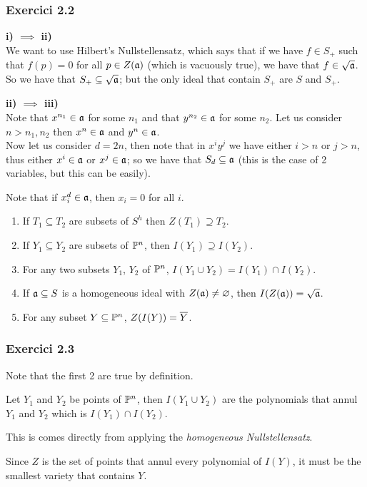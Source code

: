 \documentclass[11pt, a4paper]{article}
\begin{document}
\subsubsection{Exercici 2.2}
\textbf{i) $\implies$ ii)}\\
We want to use Hilbert's Nullstellensatz, which says that if we have $f\in S_+$ such that $f(p)=0$ for all $p\in Z(\mathfrak a)$ (which is vacuously true), we have that $f\in \sqrt{\mathfrak a}$. So we have that $S_+\subseteq \sqrt{\mathfrak a}$; but the only ideal that contain $S_+$ are $S$ and $S_+$.\par
\textbf{ii) $\implies$ iii)}\\
Note that $x^{n_1}\in \mathfrak a$ for some $n_1$ and that $y^{n_2}\in \mathfrak a$ for some $n_2$. Let us consider $n>n_1,n_2$ then $x^n\in \mathfrak a$ and $y^n\in \mathfrak a$.\\
Now let us consider $d=2n$, then note that in $x^iy^j$ we have either $i>n$ or $j>n$, thus either $x^i \in \mathfrak a$ or $x^j \in \mathfrak a$; so we have that $S_d\subseteq \mathfrak a$ (this is the case of 2 variables, but this can be easily).\par
Note that if $x_i^d\in \mathfrak a$, then $x_i=0$ for all $i$.
\newpage
\begin{tcolorbox}[title=\subsection{Exercici 2.3}]
    \begin{enumerate}
        \item If $T_1\subseteq T_2$ are subsets of $S^h$ then $Z(T_1)\supseteq T_2$.
        \item If $Y_1\subseteq Y_2$ are subsets of $\mathbb P^n$, then $I(Y_1)\supseteq I(Y_2)$.
        \item For any two subsets $Y_1$, $Y_2$ of $\mathbb P^n$, $I(Y_1\cup Y_2)=I(Y_1)\cap I(Y_2)$.
        \item If $\mathfrak a\subseteq S$ is a homogeneous ideal with $Z(\mathfrak a)\neq \varnothing$, then $I(Z(\mathfrak a))=\sqrt{\mathfrak a}$.
        \item For any subset $Y\subseteq \mathbb P^n$, $Z(I(Y))=\overline Y$.
    \end{enumerate}
\end{tcolorbox}
\subsubsection{Exercici 2.3}
Note that the first 2 are true by definition.\par
Let $Y_1$ and $Y_2$ be points of $\mathbb P^n$, then $I(Y_1\cup Y_2)$ are the polynomials that annul $Y_1$ and $Y_2$ which is $I(Y_1)\cap I(Y_2)$.\par
This is comes directly from applying the \textit{homogeneous Nullstellensatz}.\par
Since $Z$ is the set of points that annul every polynomial of $I(Y)$, it must be the smallest variety that contains $Y$.
\end{document}
